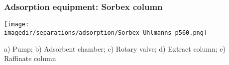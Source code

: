 \begin{frame}\frametitle{Adsorption equipment: Sorbex column}
	\begin{center}
		\texttt{[image: \\imagedir/separations/adsorption/Sorbex-Uhlmanns-p560.png]}
	\end{center}
	\vspace{-12pt}

	{\scriptsize a) Pump; b) Adsorbent chamber; c) Rotary valve; d) Extract column; e) Raffinate column}



\end{frame}

